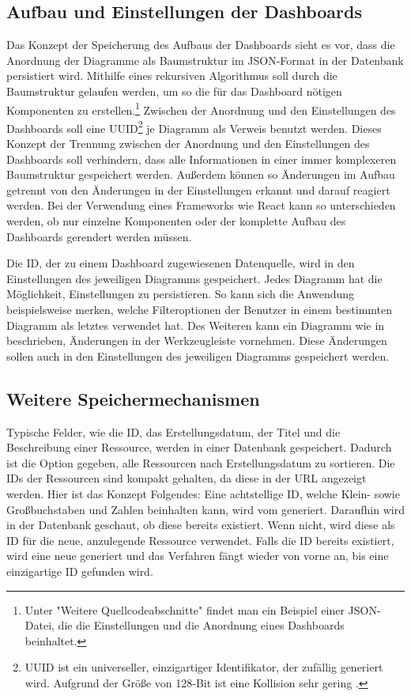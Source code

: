 \subsection{Aufbau und Einstellungen der Dashboards}
\label{subsec:aufbauundeinstellungenderdashboards}
Das Konzept der Speicherung des Aufbaus der Dashboards sieht es vor, dass die Anordnung 
der Diagramme als Baumstruktur im JSON-Format in der Datenbank persistiert wird. Mithilfe eines
rekursiven Algorithmus soll durch die Baumstruktur gelaufen werden, um so die für das Dashboard
nötigen Komponenten zu erstellen.\footnote{Unter "Weitere Quellcodeabschnitte" findet man ein Beispiel
einer JSON-Datei, die die Einstellungen und die Anordnung eines Dashboards beinhaltet.}
Zwischen der Anordnung und den Einstellungen des Dashboards soll eine UUID\footnote{UUID ist ein universeller,
einzigartiger Identifikator, der zufällig generiert wird. Aufgrund der Größe
von 128-Bit ist eine Kollision sehr gering \cite{UUIDJavaSEDocs}.} 
je Diagramm als Verweis benutzt werden. Dieses Konzept der Trennung zwischen
der Anordnung und den Einstellungen des Dashboards soll verhindern, dass
alle Informationen in einer immer komplexeren Baumstruktur gespeichert werden.
Außerdem können so Änderungen im Aufbau getrennt von den Änderungen in der
Einstellungen erkannt und darauf reagiert werden. Bei der Verwendung eines
Frameworks wie React kann so unterschieden werden, ob nur einzelne Komponenten
oder der komplette Aufbau des Dashboards gerendert werden müssen.

Die ID, der zu einem Dashboard zugewiesenen Datenquelle, wird in den Einstellungen
des jeweiligen Diagramms gespeichert. Jedes Diagramm hat die Möglichkeit,
Einstellungen zu persistieren. So kann sich die Anwendung beispielsweise merken,
welche Filteroptionen der Benutzer in einem bestimmten Diagramm als letztes verwendet
hat. Des Weiteren kann ein Diagramm wie in  beschrieben,
Änderungen in der Werkzeugleiste vornehmen. Diese Änderungen
sollen auch in den Einstellungen des jeweiligen Diagramms gespeichert werden.

\subsection{Weitere Speichermechanismen}
\label{subsec:weiterespeichermechanismen}
Typische Felder, wie die ID, das Erstellungsdatum, der Titel und die Beschreibung einer Ressource,
werden in einer Datenbank gespeichert. Dadurch ist die Option gegeben, alle
Ressourcen nach Erstellungsdatum zu sortieren. Die IDs der Ressourcen sind kompakt gehalten,
da diese in der URL angezeigt werden. Hier ist das Konzept Folgendes: Eine achtstellige ID,
welche Klein- sowie Großbuchstaben und Zahlen beinhalten kann, wird vom 
generiert. Daraufhin wird in der Datenbank geschaut, ob diese bereits existiert. Wenn nicht,
wird diese als ID für die neue, anzulegende Ressource verwendet. Falls die ID bereits existiert,
wird eine neue generiert und das Verfahren fängt wieder von vorne an, bis eine einzigartige ID gefunden wird.

